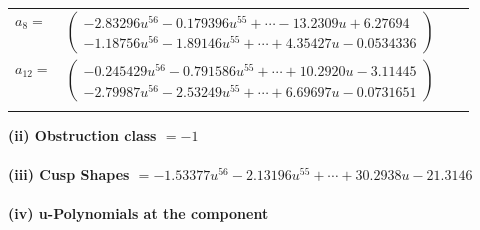 \documentclass[1p]{elsarticle_modified}
\theoremstyle{definition}
\begin{document}
\begin{tabular}{m{7pt} m{180pt} m{7pt} m{180pt} }
\flushright $a_{8}=$&$\begin{pmatrix}-2.83296 u^{56}-0.179396 u^{55}+\cdots-13.2309 u+6.27694\\-1.18756 u^{56}-1.89146 u^{55}+\cdots+4.35427 u-0.0534336\end{pmatrix}$ \\
\flushright $a_{12}=$&$\begin{pmatrix}-0.245429 u^{56}-0.791586 u^{55}+\cdots+10.2920 u-3.11445\\-2.79987 u^{56}-2.53249 u^{55}+\cdots+6.69697 u-0.0731651\end{pmatrix}$\\&\end{tabular}
\flushleft \textbf{(ii) Obstruction class $= -1$}\\~\\
\flushleft \textbf{(iii) Cusp Shapes $= -1.53377 u^{56}-2.13196 u^{55}+\cdots+30.2938 u-21.3146$}\\~\\
\newpage\renewcommand{\arraystretch}{1}
\flushleft \textbf{(iv) u-Polynomials at the component}\newline \\
\end{document}
